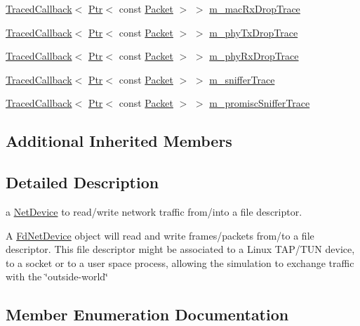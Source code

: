 \begin{DoxyCompactItemize}
\hyperlink{classns3_1_1TracedCallback}{Traced\+Callback}$<$ \hyperlink{classns3_1_1Ptr}{Ptr}$<$ const \hyperlink{classns3_1_1Packet}{Packet} $>$ $>$ \hyperlink{classns3_1_1FdNetDevice_a1aa224dd6e458d104dda994ea7448f7d}{m\+\_\+mac\+Rx\+Drop\+Trace}
\item 
\hyperlink{classns3_1_1TracedCallback}{Traced\+Callback}$<$ \hyperlink{classns3_1_1Ptr}{Ptr}$<$ const \hyperlink{classns3_1_1Packet}{Packet} $>$ $>$ \hyperlink{classns3_1_1FdNetDevice_acd0f33f8fede665976f2485300c20810}{m\+\_\+phy\+Tx\+Drop\+Trace}
\item 
\hyperlink{classns3_1_1TracedCallback}{Traced\+Callback}$<$ \hyperlink{classns3_1_1Ptr}{Ptr}$<$ const \hyperlink{classns3_1_1Packet}{Packet} $>$ $>$ \hyperlink{classns3_1_1FdNetDevice_ab0049e3c36f1916a8b15de5446ce192c}{m\+\_\+phy\+Rx\+Drop\+Trace}
\item 
\hyperlink{classns3_1_1TracedCallback}{Traced\+Callback}$<$ \hyperlink{classns3_1_1Ptr}{Ptr}$<$ const \hyperlink{classns3_1_1Packet}{Packet} $>$ $>$ \hyperlink{classns3_1_1FdNetDevice_a821080a2cc1253e22918e8fcedcfbe58}{m\+\_\+sniffer\+Trace}
\item 
\hyperlink{classns3_1_1TracedCallback}{Traced\+Callback}$<$ \hyperlink{classns3_1_1Ptr}{Ptr}$<$ const \hyperlink{classns3_1_1Packet}{Packet} $>$ $>$ \hyperlink{classns3_1_1FdNetDevice_a7f43138ecf824b335eb80eeebdb91eb6}{m\+\_\+promisc\+Sniffer\+Trace}
\end{DoxyCompactItemize}
\subsection*{Additional Inherited Members}


\subsection{Detailed Description}
a \hyperlink{classns3_1_1NetDevice}{Net\+Device} to read/write network traffic from/into a file descriptor. 

A \hyperlink{classns3_1_1FdNetDevice}{Fd\+Net\+Device} object will read and write frames/packets from/to a file descriptor. This file descriptor might be associated to a Linux T\+A\+P/\+T\+UN device, to a socket or to a user space process, allowing the simulation to exchange traffic with the \char`\"{}outside-\/world\char`\"{} 

\subsection{Member Enumeration Documentation}
